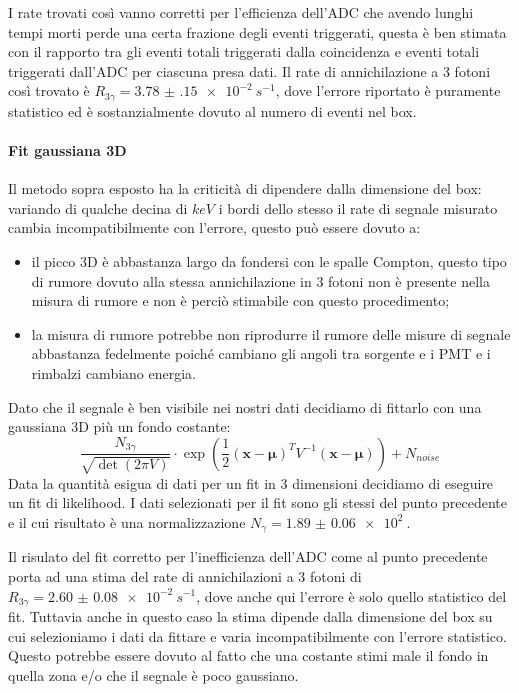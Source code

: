 I rate trovati così vanno corretti per l'efficienza dell'ADC che avendo lunghi tempi morti perde una certa frazione degli eventi triggerati, questa è ben stimata con il rapporto tra gli eventi totali triggerati dalla coincidenza e eventi totali triggerati dall'ADC per ciascuna presa dati.
Il rate di annichilazione a 3 fotoni così trovato è $R_{3\gamma} = \SI{3.78(15)e-2}{s^{-1}}$, dove l'errore riportato è puramente statistico ed è sostanzialmente dovuto al numero di eventi nel box.

\paragraph{Fit gaussiana 3D}
Il metodo sopra esposto ha la criticità di dipendere dalla dimensione del box: variando di qualche decina di $\si{keV}$ i bordi dello stesso il rate di segnale misurato cambia incompatibilmente con l'errore, questo può essere dovuto a:
\begin{itemize}
	\item il picco 3D è abbastanza largo da fondersi con le spalle Compton, questo tipo di rumore dovuto alla stessa annichilazione in 3 fotoni non è presente nella misura di rumore e non è perciò stimabile con questo procedimento;
	\item la misura di rumore potrebbe non riprodurre il rumore delle misure di segnale abbastanza fedelmente poiché cambiano gli angoli tra sorgente e i PMT e i rimbalzi cambiano energia.
\end{itemize}
Dato che il segnale è ben visibile nei nostri dati decidiamo di fittarlo con una gaussiana 3D più un fondo costante: 
\begin{equation*}
\frac{N_{3\gamma}}{\sqrt{\det(2\pi V)}} \cdot \exp ( \frac{1}{2} (\textbf{x}-\boldsymbol{\mu})^T V^{-1}( \textbf{x}-\boldsymbol{\mu} ) ) + N_{noise}
\end{equation*}
Data la quantità esigua di dati per un fit in 3 dimensioni decidiamo di eseguire un fit di likelihood. I dati selezionati per il fit sono gli stessi del punto precedente e il cui risultato è una normalizzazione $N_{\gamma} = \SI{1.89(6)e2}{}$.


Il risulato del fit corretto per l'inefficienza dell'ADC come al punto precedente porta ad una stima del rate di annichilazioni a 3 fotoni di $R_{3\gamma} = \SI{2.60(8)e-2}{s^{-1}}$, dove anche qui l'errore è solo quello statistico del fit.
Tuttavia anche in questo caso la stima dipende dalla dimensione del box su cui selezioniamo i dati da fittare e varia incompatibilmente con l'errore statistico. Questo potrebbe essere dovuto al fatto che una costante stimi male il fondo in quella zona e/o che il segnale è poco gaussiano.

